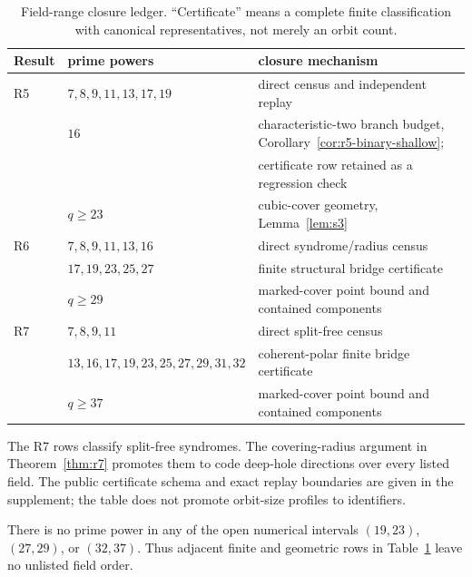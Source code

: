 \begin{table}[ht]
\centering
\small
\caption{Field-range closure ledger.  ``Certificate'' means a complete
finite classification with canonical representatives, not merely an
orbit count.}
\label{tab:field-ranges}
\begin{tabular}{lll}
\toprule
Result & prime powers & closure mechanism\\
\midrule
R5 & $7,8,9,11,13,17,19$ & direct census and independent replay\\
   & $16$ & characteristic-two branch budget,
       Corollary~\ref{cor:r5-binary-shallow};\\
   & & certificate row retained as a regression check\\
   & $q\geq23$ & cubic-cover geometry, Lemma~\ref{lem:s3}\\
R6 & $7,8,9,11,13,16$ & direct syndrome/radius census\\
   & $17,19,23,25,27$ & finite structural bridge certificate\\
   & $q\geq29$ & marked-cover point bound and contained components\\
R7 & $7,8,9,11$ & direct split-free census\\
   & $13,16,17,19,23,25,27,29,31,32$ &
       coherent-polar finite bridge certificate\\
   & $q\geq37$ & marked-cover point bound and contained components\\
\bottomrule
\end{tabular}
\end{table}

The R7 rows classify split-free syndromes.  The covering-radius argument in
Theorem~\ref{thm:r7} promotes them to code deep-hole directions over every
listed field.  The public certificate schema and exact
replay boundaries are given in the supplement; the table does not
promote orbit-size profiles to identifiers.

There is no prime power in any of the open numerical intervals
\((19,23)\), \((27,29)\), or \((32,37)\).  Thus adjacent finite and
geometric rows in Table~\ref{tab:field-ranges} leave no unlisted field
order.
